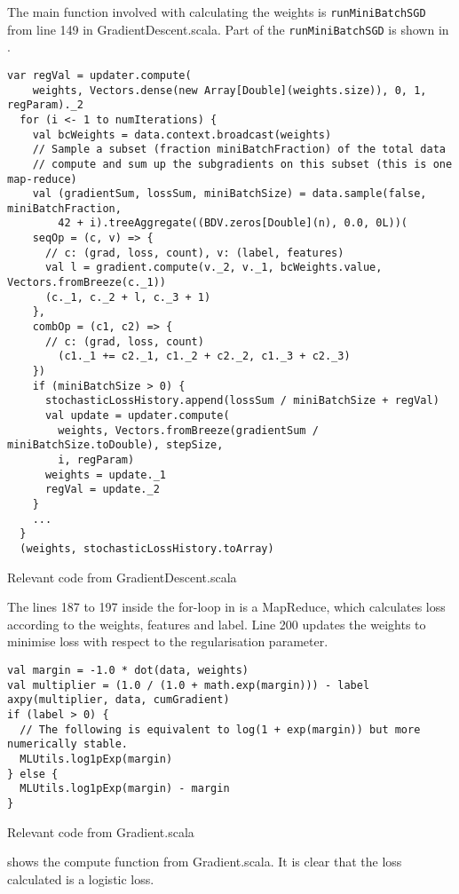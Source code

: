 The main function involved with calculating the weights is \texttt{runMiniBatchSGD} from line 149 in GradientDescent.scala. Part of the \texttt{runMiniBatchSGD} is shown in . 
\begin{listing}[H]
\begin{verbatim}
var regVal = updater.compute(
    weights, Vectors.dense(new Array[Double](weights.size)), 0, 1, regParam)._2
  for (i <- 1 to numIterations) {
    val bcWeights = data.context.broadcast(weights)
    // Sample a subset (fraction miniBatchFraction) of the total data
    // compute and sum up the subgradients on this subset (this is one map-reduce)
    val (gradientSum, lossSum, miniBatchSize) = data.sample(false, miniBatchFraction,
        42 + i).treeAggregate((BDV.zeros[Double](n), 0.0, 0L))(
    seqOp = (c, v) => {
      // c: (grad, loss, count), v: (label, features)
      val l = gradient.compute(v._2, v._1, bcWeights.value, Vectors.fromBreeze(c._1))
      (c._1, c._2 + l, c._3 + 1)
    },
    combOp = (c1, c2) => {
      // c: (grad, loss, count)
        (c1._1 += c2._1, c1._2 + c2._2, c1._3 + c2._3)
    })
    if (miniBatchSize > 0) {
      stochasticLossHistory.append(lossSum / miniBatchSize + regVal)
      val update = updater.compute(
        weights, Vectors.fromBreeze(gradientSum / miniBatchSize.toDouble), stepSize,
        i, regParam)
      weights = update._1
      regVal = update._2
    }
    ...
  }
  (weights, stochasticLossHistory.toArray)
\end{verbatim}
\caption{Relevant code from GradientDescent.scala}
\label{lst:runMiniBatchSGD}
\end{listing}
The lines 187 to 197 inside the for-loop in  is a MapReduce, which calculates loss according to the weights, features and label. Line 200 updates the weights to minimise loss with respect to the regularisation parameter.
 
\begin{listing}[H]
\begin{verbatim}
val margin = -1.0 * dot(data, weights)
val multiplier = (1.0 / (1.0 + math.exp(margin))) - label
axpy(multiplier, data, cumGradient)
if (label > 0) {
  // The following is equivalent to log(1 + exp(margin)) but more numerically stable.
  MLUtils.log1pExp(margin)
} else {
  MLUtils.log1pExp(margin) - margin
}
\end{verbatim}
\caption{Relevant code from Gradient.scala}
\label{lst:sparkloss}
\end{listing}
 shows the compute function from Gradient.scala. It is clear that the loss calculated is a logistic loss.
 


